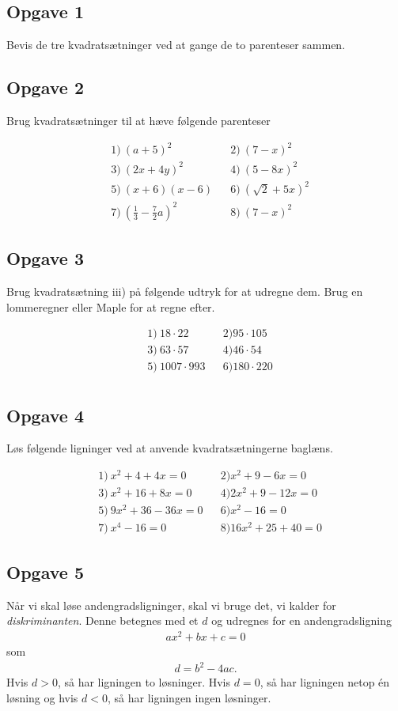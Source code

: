 \subsection*{Opgave 1}
Bevis de tre kvadratsætninger ved at gange de to parenteser sammen. 

\subsection*{Opgave 2}
Brug kvadratsætninger til at hæve følgende parenteser

\begin{align*}
	&1) \ (a + 5)^2  &  &2) \  (7 - x)^2 \\
	&3) \ (2x + 4y)^2  &  &4) \  (5 - 8x)^2 \\
	&5) \ (x+6)(x-6)  &  &6) \  (\sqrt{2} + 5x)^2 \\
	&7) \ (\frac{1}{3} - \frac{7}{2}a)^2  &  &8) \  (7 - x)^2
\end{align*}

\subsection*{Opgave 3}
Brug kvadratsætning  iii) på følgende udtryk for at udregne dem. Brug en lommeregner eller Maple for at regne efter.

\begin{align*}
	&1) \ 18\cdot 22 & & 2) 95\cdot 105 \\
	&3) \ 63\cdot 57 & & 4) 46\cdot 54 \\
	&5) \ 1007\cdot 993 & & 6) 180\cdot 220 \\
\end{align*}

\subsection*{Opgave 4}
Løs følgende ligninger ved at anvende kvadratsætningerne baglæns.

\begin{align*}
	&1) \ x^2 + 4 + 4x = 0 & &2) x^2 +9 - 6x = 0 \\
	&3) \ x^2 + 16 + 8x = 0 & &4) 2x^2 + 9 - 12x = 0	\\
	&5) \ 9x^2 + 36 - 36x = 0 & &6) x^2 - 16 = 0	\\
	&7) \ x^4 -16 = 0 & &8) 16x^2 + 25 + 40 = 0	
\end{align*}

\subsection*{Opgave 5}
Når vi skal løse andengradsligninger, skal vi bruge det, vi kalder for \textit{diskriminanten}. Denne betegnes med et $d$ og udregnes for en andengradsligning
\begin{align*}
	ax^2 + bx + c = 0
\end{align*}
som
\begin{align*}
	d = b^2 - 4ac.
\end{align*}
Hvis $d> 0$, så har ligningen to løsninger. Hvis $d = 0$, så har ligningen netop én løsning og hvis $d < 0$, så har ligningen ingen løsninger. 

